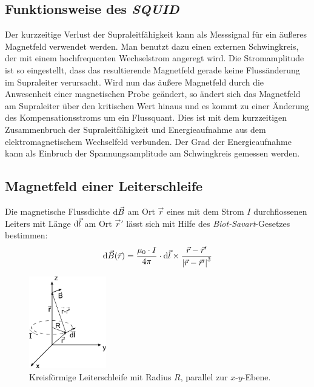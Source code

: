 \subsection{Funktionsweise des \emph{SQUID}}
Der kurzzeitige Verlust der Supraleitfähigkeit kann als Messsignal für ein äußeres Magnetfeld verwendet werden.
Man benutzt dazu einen externen Schwingkreis, der mit einem hochfrequenten Wechselstrom angeregt wird.
Die Stromamplitude ist so eingestellt, dass das resultierende Magnetfeld gerade keine Flussänderung
im Supraleiter verursacht. Wird nun das äußere Magnetfeld durch die Anwesenheit einer magnetischen Probe geändert,
so ändert sich das Magnetfeld am Supraleiter über den kritischen Wert hinaus und es kommt zu einer Änderung
des Kompensationsstroms um ein Flussquant. Dies ist mit dem kurzzeitigen
Zusammenbruch der Supraleitfähigkeit und Energieaufnahme aus dem elektromagnetischem Wechselfeld verbunden.
Der Grad der Energieaufnahme kann als Einbruch der Spannungsamplitude am Schwingkreis
gemessen werden.


\subsection{Magnetfeld einer Leiterschleife}
Die magnetische Flussdichte $\mathrm{d} \vec{B}$ am Ort $\vec{r}$ eines mit dem Strom $I$ durchflossenen
Leiters mit Länge $\mathrm{d} \vec{l}$ 
am Ort $\vec{r}'$ lässt sich mit Hilfe des \emph{Biot-Savart}-Gesetzes bestimmen:
\begin{equation}
  \label{eq:biotsavart}
  \mathrm{d} \vec{B}(\vec{r}) = \frac{\mu_0 \cdot I}{4 \pi} \cdot \mathrm{d} \vec{l} \times \frac{\vec{r} - \vec{r}'}{\left|\vec{r} - \vec{r}'\right|^3}
\end{equation} 

\begin{figure}[H]
\begin{center}
  \includegraphics[width=0.3\textwidth]{../img/circloop.pdf}
  \caption{Kreisförmige Leiterschleife mit Radius $R$, parallel zur $x$-$y$-Ebene.}
  \label{img:circloop}
\end{center}
\end{figure}

